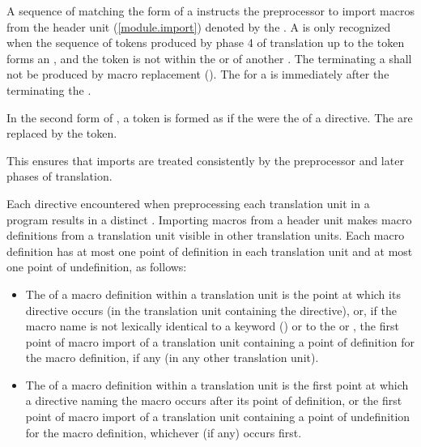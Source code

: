 \begin{std.txt}
\color{addclr}
\pnum
A sequence of  matching the form
of a 
instructs the preprocessor to import macros from the header unit
(\ref{module.import}) denoted by the .
A  is only recognized when the sequence of tokens
produced by phase 4 of translation up to the  token
forms an , and the  token is not
within the  or
 of another .
The \tcode{;} 
terminating a 
shall not be produced by
macro replacement ().
The  for a  is
immediately after the \tcode{;} terminating the .

\color{addclr}
\pnum
In the second form of ,
a  token is formed as if
the 
were the  of a  directive.
The  are replaced by
the  token.
\begin{note}
This ensures that imports are treated consistently by
the preprocessor and later phases of translation.
\end{note}

\color{addclr}
\pnum
Each  directive encountered when preprocessing
each translation unit in a program results in a distinct
.
Importing macros from a header unit makes macro definitions
from a translation unit visible in other translation units.
Each macro definition has at most one point of definition in
each translation unit and at most one point of undefinition, as follows:
\begin{itemize}
\item
The  of a macro definition within a translation unit
is the point at which its  directive occurs (in the translation
unit containing the  directive), or,
if the macro name is not lexically identical to a keyword ()
or to the   or ,
the first point
of macro import of a translation unit containing a point of definition for the
macro definition, if any (in any other translation unit).

\item
The  of a macro definition within a translation unit
is the first point at which a  directive naming the macro occurs
after its point of definition, or the first point
of macro import of a translation unit containing a point of undefinition for the
macro definition, whichever (if any) occurs first.
\end{itemize}


\end{std.txt}
